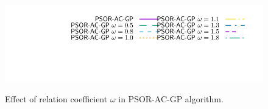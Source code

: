 \begin{figure}
\\
{\includegraphics[height=\legendheight]{figure/PSOR/1.0e-08/50/time/profile-Chain_legend.pdf}} 
  \caption{Effect of relation coefficient $\omega$ in {\sf PSOR-AC-GP} algorithm.}
  \label{fig:PSOR}
\end{figure}

